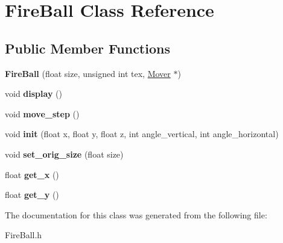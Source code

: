 \hypertarget{classFireBall}{}\section{Fire\+Ball Class Reference}
\label{classFireBall}
\subsection*{Public Member Functions}
\begin{DoxyCompactItemize}
\item 
\mbox{\label{classFireBall_a3b38dd5ab1ab31c60b2f50366c1b9f74}} 
{\bfseries Fire\+Ball} (float size, unsigned int tex, \hyperlink{classMover}{Mover} $\ast$)
\item 
\mbox{\label{classFireBall_af9bcb6c7a1ed6a8df73091de2be6e222}} 
void {\bfseries display} ()
\item 
\mbox{\label{classFireBall_a7e064007c68fd6106189b0f69b1a850e}} 
void {\bfseries move\+\_\+step} ()
\item 
\mbox{\label{classFireBall_acd649b7fc58547b2ac8cd09e22ca2b20}} 
void {\bfseries init} (float x, float y, float z, int angle\+\_\+vertical, int angle\+\_\+horizontal)
\item 
\mbox{\label{classFireBall_a069586d69311159f80a1c8d3d848502e}} 
void {\bfseries set\+\_\+orig\+\_\+size} (float size)
\item 
\mbox{\label{classFireBall_a4c71d3cf7209ef9e03ea38ea90c0d508}} 
float {\bfseries get\+\_\+x} ()
\item 
\mbox{\label{classFireBall_a1b262f0d003fa19f87ce1d944fae56ab}} 
float {\bfseries get\+\_\+y} ()
\end{DoxyCompactItemize}


The documentation for this class was generated from the following file\+:\begin{DoxyCompactItemize}
\item 
Fire\+Ball.\+h\end{DoxyCompactItemize}
